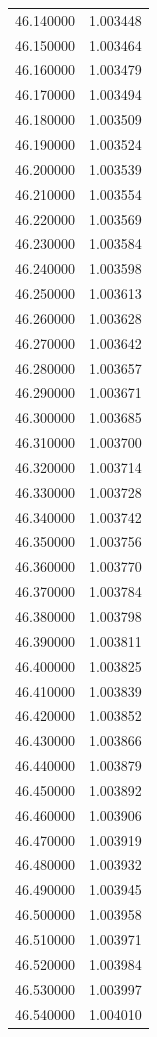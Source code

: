 \begin{tabular}{rr}
46.140000 & 1.003448 \\
46.150000 & 1.003464 \\
46.160000 & 1.003479 \\
46.170000 & 1.003494 \\
46.180000 & 1.003509 \\
46.190000 & 1.003524 \\
46.200000 & 1.003539 \\
46.210000 & 1.003554 \\
46.220000 & 1.003569 \\
46.230000 & 1.003584 \\
46.240000 & 1.003598 \\
46.250000 & 1.003613 \\
46.260000 & 1.003628 \\
46.270000 & 1.003642 \\
46.280000 & 1.003657 \\
46.290000 & 1.003671 \\
46.300000 & 1.003685 \\
46.310000 & 1.003700 \\
46.320000 & 1.003714 \\
46.330000 & 1.003728 \\
46.340000 & 1.003742 \\
46.350000 & 1.003756 \\
46.360000 & 1.003770 \\
46.370000 & 1.003784 \\
46.380000 & 1.003798 \\
46.390000 & 1.003811 \\
46.400000 & 1.003825 \\
46.410000 & 1.003839 \\
46.420000 & 1.003852 \\
46.430000 & 1.003866 \\
46.440000 & 1.003879 \\
46.450000 & 1.003892 \\
46.460000 & 1.003906 \\
46.470000 & 1.003919 \\
46.480000 & 1.003932 \\
46.490000 & 1.003945 \\
46.500000 & 1.003958 \\
46.510000 & 1.003971 \\
46.520000 & 1.003984 \\
46.530000 & 1.003997 \\
46.540000 & 1.004010 \\

\end{tabular}
